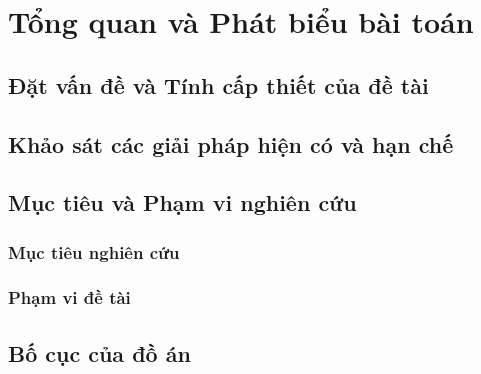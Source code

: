 \chapter{Tổng quan và Phát biểu bài toán}
\label{ch:intro}

\section{Đặt vấn đề và Tính cấp thiết của đề tài}

\section{Khảo sát các giải pháp hiện có và hạn chế}

\section{Mục tiêu và Phạm vi nghiên cứu}
\subsection{Mục tiêu nghiên cứu}

\subsection{Phạm vi đề tài}

\section{Bố cục của đồ án}

